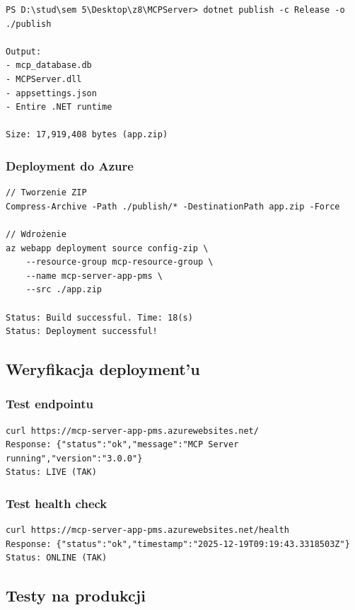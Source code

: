 \documentclass[twoside]{article}
\begin{document}
\begin{verbatim}
PS D:\stud\sem 5\Desktop\z8\MCPServer> dotnet publish -c Release -o ./publish

Output:
- mcp_database.db
- MCPServer.dll
- appsettings.json
- Entire .NET runtime

Size: 17,919,408 bytes (app.zip)
\end{verbatim}

\subsubsection{Deployment do Azure}

\begin{verbatim}
// Tworzenie ZIP
Compress-Archive -Path ./publish/* -DestinationPath app.zip -Force

// Wdrożenie
az webapp deployment source config-zip \
	--resource-group mcp-resource-group \
	--name mcp-server-app-pms \
	--src ./app.zip

Status: Build successful. Time: 18(s)
Status: Deployment successful!
\end{verbatim}

\subsection{Weryfikacja deployment'u}

\subsubsection{Test endpointu}

\begin{verbatim}
curl https://mcp-server-app-pms.azurewebsites.net/
Response: {"status":"ok","message":"MCP Server running","version":"3.0.0"}
Status: LIVE (TAK)
\end{verbatim}

\subsubsection{Test health check}

\begin{verbatim}
curl https://mcp-server-app-pms.azurewebsites.net/health
Response: {"status":"ok","timestamp":"2025-12-19T09:19:43.3318503Z"}
Status: ONLINE (TAK)
\end{verbatim}

\subsection{Testy na produkcji}
\end{document}

